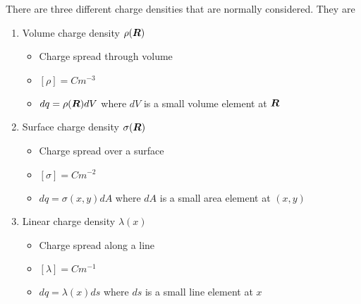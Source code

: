 \documentclass{article}
\begin{document}
    There are three different charge densities that are normally considered.
    They are
    \begin{enumerate}
        \item Volume charge density \(\rho(\bm{R})\)
        \begin{itemize}
            \item Charge spread through volume
            \item \([\rho] = \si{Cm^{-3}}\)
            \item \(dq = \rho(\bm{R})dV\) where \(dV\) is a small volume element at \(\bm{R}\)
        \end{itemize}
        \item Surface charge density \(\sigma(\bm{R})\)
        \begin{itemize}
            \item Charge spread over a surface
            \item \([\sigma] = \si{Cm^{-2}}\)
            \item \(dq = \sigma(x, y)dA\) where \(dA\) is a small area element at \((x, y)\)
        \end{itemize}
        \item Linear charge density \(\lambda(x)\)
        \begin{itemize}
            \item Charge spread along a line
            \item \([\lambda] = \si{Cm^{-1}}\)
            \item \(dq = \lambda(x)ds\) where \(ds\) is a small line element at \(x\)
        \end{itemize}
    \end{enumerate}
    
\end{document}
